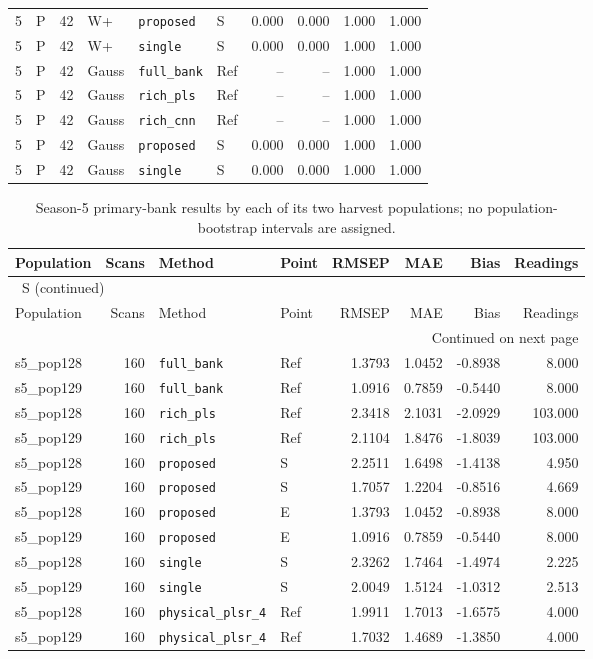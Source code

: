 \documentclass[10pt,a4paper]{article}
\renewcommand{\thetable}{S\arabic{table}}
\begin{document}
\begin{longtable}{rlrlllrrrr}
5 & P & 42 & W+ & \texttt{proposed} & S & 0.000 & 0.000 & 1.000 & 1.000 \\
5 & P & 42 & W+ & \texttt{single} & S & 0.000 & 0.000 & 1.000 & 1.000 \\
5 & P & 42 & Gauss & \texttt{full\_bank} & Ref & -- & -- & 1.000 & 1.000 \\
5 & P & 42 & Gauss & \texttt{rich\_pls} & Ref & -- & -- & 1.000 & 1.000 \\
5 & P & 42 & Gauss & \texttt{rich\_cnn} & Ref & -- & -- & 1.000 & 1.000 \\
5 & P & 42 & Gauss & \texttt{proposed} & S & 0.000 & 0.000 & 1.000 & 1.000 \\
5 & P & 42 & Gauss & \texttt{single} & S & 0.000 & 0.000 & 1.000 & 1.000 \\
\end{longtable}
\endgroup

\begingroup\footnotesize
\setlength{\tabcolsep}{3.5pt}
\renewcommand{\arraystretch}{1.10}
\begin{longtable}{lrllrrrr}
\caption{Season-5 primary-bank results by each of its two harvest populations; no population-bootstrap intervals are assigned.}\label{tab:season5groups}\\
\toprule
Population & Scans & Method & Point & RMSEP & MAE & Bias & Readings \\
\midrule
\endfirsthead
\multicolumn{8}{l}{\tablename~\thetable{} (continued)}\\
\toprule
Population & Scans & Method & Point & RMSEP & MAE & Bias & Readings \\
\midrule
\endhead
\midrule
\multicolumn{8}{r}{Continued on next page}\\
\endfoot
\bottomrule
\endlastfoot
s5\_pop128 & 160 & \texttt{full\_bank} & Ref & 1.3793 & 1.0452 & -0.8938 & 8.000 \\
s5\_pop129 & 160 & \texttt{full\_bank} & Ref & 1.0916 & 0.7859 & -0.5440 & 8.000 \\
s5\_pop128 & 160 & \texttt{rich\_pls} & Ref & 2.3418 & 2.1031 & -2.0929 & 103.000 \\
s5\_pop129 & 160 & \texttt{rich\_pls} & Ref & 2.1104 & 1.8476 & -1.8039 & 103.000 \\
s5\_pop128 & 160 & \texttt{proposed} & S & 2.2511 & 1.6498 & -1.4138 & 4.950 \\
s5\_pop129 & 160 & \texttt{proposed} & S & 1.7057 & 1.2204 & -0.8516 & 4.669 \\
s5\_pop128 & 160 & \texttt{proposed} & E & 1.3793 & 1.0452 & -0.8938 & 8.000 \\
s5\_pop129 & 160 & \texttt{proposed} & E & 1.0916 & 0.7859 & -0.5440 & 8.000 \\
s5\_pop128 & 160 & \texttt{single} & S & 2.3262 & 1.7464 & -1.4974 & 2.225 \\
s5\_pop129 & 160 & \texttt{single} & S & 2.0049 & 1.5124 & -1.0312 & 2.513 \\
s5\_pop128 & 160 & \texttt{physical\_plsr\_4} & Ref & 1.9911 & 1.7013 & -1.6575 & 4.000 \\
s5\_pop129 & 160 & \texttt{physical\_plsr\_4} & Ref & 1.7032 & 1.4689 & -1.3850 & 4.000 \\
\end{longtable}
\endgroup
\end{document}
